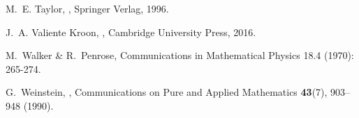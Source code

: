 \documentclass[10pt,a4paper]{article}
\theoremstyle{plain}
\begin{document}
\begin{thebibliography}{10}
M.~E. Taylor,
,
\newblock Springer Verlag, 1996.

J.~A. {Valiente Kroon},
,
\newblock Cambridge University Press, 2016.

M.~Walker \& R.~Penrose,
\newblock Communications in Mathematical Physics 18.4 (1970): 265-274.

G.~Weinstein,
,
\newblock Communications on Pure and Applied Mathematics {\bf 43}(7), 903--948
  (1990).

\end{thebibliography}
\end{document}
